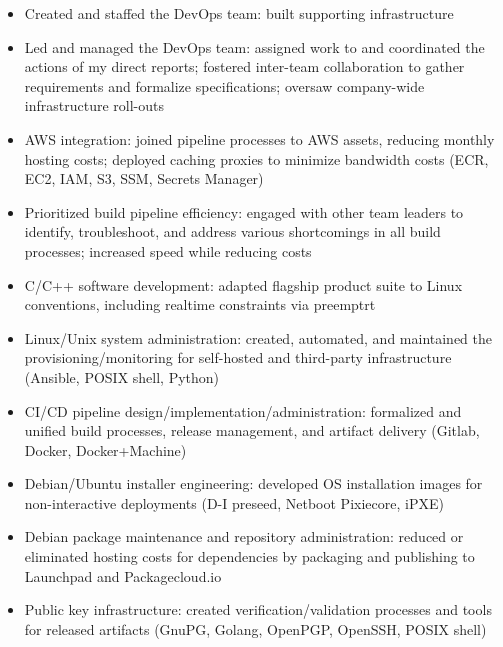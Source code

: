 \documentclass[letterpaper,10pt]{article}
\begin{document}

\begin{itemize}

\item
  Created and staffed the DevOps team: built supporting infrastructure
\item
  Led and managed the DevOps team: assigned work to and coordinated the actions
  of my direct reports; fostered inter-team collaboration to gather
  requirements and formalize specifications; oversaw company-wide
  infrastructure roll-outs
\item
  AWS integration: joined pipeline processes to AWS assets, reducing monthly
  hosting costs; deployed caching proxies to minimize bandwidth costs (ECR,
  EC2, IAM, S3, SSM, Secrets Manager)
\item
  Prioritized build pipeline efficiency: engaged with other team leaders to
  identify, troubleshoot, and address various shortcomings in all build
  processes; increased speed while reducing costs
\item
  C/C++ software development: adapted flagship product suite to Linux
  conventions, including realtime constraints via preemptrt
\item
  Linux/Unix system administration: created, automated, and maintained the
  provisioning/monitoring for self-hosted and third-party infrastructure
  (Ansible, POSIX shell, Python)
\item
  CI/CD pipeline design/implementation/administration: formalized and unified
  build processes, release management, and artifact delivery (Gitlab, Docker,
  Docker+Machine)
\item
  Debian/Ubuntu installer engineering: developed OS installation images for
  non-interactive deployments (D-I preseed, Netboot Pixiecore, iPXE)
\item
  Debian package maintenance and repository administration: reduced or
  eliminated hosting costs for dependencies by packaging and publishing to
  Launchpad and Packagecloud.io
\item
  Public key infrastructure: created verification/validation processes and
  tools for released artifacts (GnuPG, Golang, OpenPGP, OpenSSH, POSIX shell)

\end{itemize}

\end{document}

